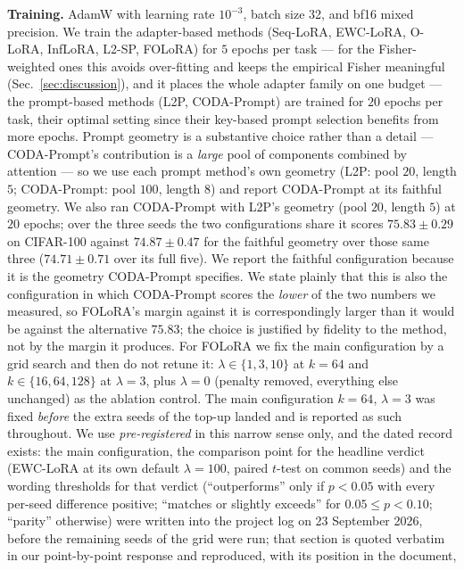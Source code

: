 \textbf{Training.} AdamW with learning rate $10^{-3}$, batch size 32, and bf16 mixed
precision. We train the adapter-based methods (Seq-LoRA, EWC-LoRA, O-LoRA, InfLoRA,
L2-SP, FOLoRA) for $5$ epochs per task --- for the Fisher-weighted ones this avoids over-fitting
and keeps the empirical Fisher meaningful (Sec.~\ref{sec:discussion}), and it places the
whole adapter family on one budget --- the prompt-based methods (L2P, CODA-Prompt) are
trained for $20$ epochs per task, their optimal setting since their key-based prompt
selection benefits from more epochs. Prompt geometry is a substantive choice rather than a detail
--- CODA-Prompt's contribution is a \emph{large} pool of components combined by attention
--- so we use each prompt method's own geometry (L2P: pool $20$, length $5$;
CODA-Prompt: pool $100$, length $8$) and report CODA-Prompt at its faithful geometry.
We also ran CODA-Prompt with L2P's geometry (pool $20$, length $5$) at $20$ epochs; over
the three seeds the two configurations share it scores $75.83\pm0.29$ on CIFAR-100 against
$74.87\pm0.47$ for the faithful geometry over those same three ($74.71\pm0.71$ over its
full five). We report the faithful
configuration because it is the geometry CODA-Prompt specifies. We state plainly that this
is also the configuration in which CODA-Prompt scores the \emph{lower} of the two numbers we
measured, so FOLoRA's margin against it is correspondingly larger than it would be against
the alternative $75.83$; the choice is justified by fidelity to the method, not by the
margin it produces.
For FOLoRA we fix the main configuration by a grid search and then do not retune it:
$\lambda\in\{1,3,10\}$ at $k{=}64$ and $k\in\{16,64,128\}$ at $\lambda{=}3$, plus
$\lambda{=}0$ (penalty removed, everything else unchanged) as the ablation control. The
main configuration $k{=}64$, $\lambda{=}3$ was fixed \emph{before} the extra seeds of the
top-up landed and is reported as such throughout. We use \emph{pre-registered} in this
narrow sense only, and the dated record exists: the main configuration, the comparison point
for the headline verdict (EWC-LoRA at its own default $\lambda{=}100$, paired $t$-test on
common seeds) and the wording thresholds for that verdict (``outperforms'' only if
$p<0.05$ with every per-seed difference positive; ``matches or slightly exceeds'' for
$0.05\le p<0.10$; ``parity'' otherwise) were written into the project log on
23 September 2026, before the remaining seeds of the grid were run; that section is quoted
verbatim in our point-by-point response and reproduced, with its position in the document,
